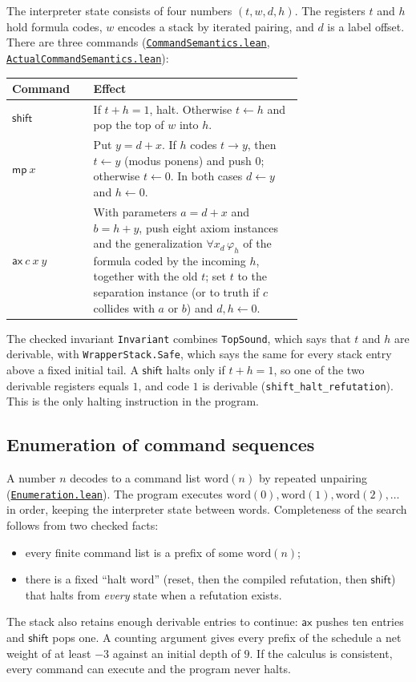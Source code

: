 \documentclass[11pt,letterpaper]{article}
\newcommand{\src}[2]{\href{https://github.com/jamesyc/BusyBeaver/blob/main/#1}{\texttt{\nolinkurl{#2}}}}
\newcommand{\repo}[1]{\texttt{\nolinkurl{#1}}}
\begin{document}
The interpreter state consists of four numbers $(t,w,d,h)$. The registers
$t$ and $h$ hold formula codes, $w$ encodes a stack by iterated pairing,
and $d$ is a label offset. There are three commands
(\src{Lean/metamathematics/PA215PA/CommandSemantics.lean}{CommandSemantics.lean},
\src{Lean/metamathematics/PA215PA/ActualCommandSemantics.lean}{ActualCommandSemantics.lean}):
\begin{center}\small
\begin{tabular}{@{}lp{0.72\linewidth}@{}}
\toprule
Command & Effect \\
\midrule
$\mathsf{shift}$ & If $t+h=1$, halt. Otherwise $t\gets h$ and pop the
top of $w$ into $h$. \\
$\mathsf{mp}\ x$ & Put $y=d+x$. If $h$ codes $t\to y$, then $t\gets y$
(modus ponens) and push $0$; otherwise $t\gets 0$. In both cases
$d\gets y$ and $h\gets 0$. \\
$\mathsf{ax}\ c\ x\ y$ & With parameters $a=d+x$ and $b=h+y$, push eight
axiom instances and the generalization $\forall x_d\,\varphi_h$ of the
formula coded by the incoming $h$, together
with the old $t$; set $t$ to the separation instance (or to truth if $c$
collides with $a$ or $b$) and $d,h\gets0$. \\
\bottomrule
\end{tabular}
\end{center}
The checked invariant \texttt{Invariant} combines \texttt{TopSound}, which
says that $t$ and $h$ are derivable, with \texttt{WrapperStack.Safe}, which
says the same for every stack entry above a fixed initial tail. A $\mathsf{shift}$
halts only if $t+h=1$, so one of the two derivable registers equals $1$,
and code $1$ is derivable (\repo{shift_halt_refutation}). This is the
only halting instruction in the program.

\subsection{Enumeration of command sequences}

A number $n$ decodes to a command list $\mathrm{word}(n)$ by repeated
unpairing
(\src{Lean/PA215/Source/Enumeration.lean}{Enumeration.lean}). The program
executes $\mathrm{word}(0),\mathrm{word}(1),\mathrm{word}(2),\ldots$ in
order, keeping the interpreter state between words. Completeness of the
search follows from two checked facts:
\begin{itemize}
\item every finite command list is a prefix of some $\mathrm{word}(n)$;
\item there is a fixed ``halt word'' (reset, then the compiled
refutation, then $\mathsf{shift}$) that halts from \emph{every} state when
a refutation exists.
\end{itemize}
The stack also retains enough derivable entries to continue:
$\mathsf{ax}$ pushes ten entries and $\mathsf{shift}$ pops one. A counting
argument gives every prefix of the schedule a net weight of at least $-3$
against an initial depth of $9$. If the calculus is consistent, every
command can execute and the program never halts.
\end{document}
